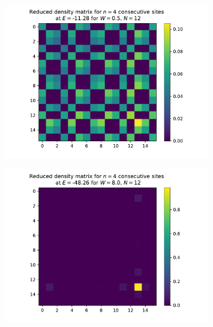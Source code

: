 \documentclass[reprint,amsmath,amssymb,aps,prb]{revtex4-2}
\begin{document}
\begin{center}
\begin{figure}[H]
\begin{subfigure}[c]{0.45\textwidth}
		\end{subfigure}
		\begin{subfigure}[c]{0.45\textwidth}
			\includegraphics[width=\textwidth]{../results/groundstates/N12n4_trainingset_groundstate_Wmax0.5.pdf}
		\end{subfigure}
		\begin{subfigure}[c]{0.45\textwidth}
			\includegraphics[width=\textwidth]{../results/groundstates/N12n4_trainingset_groundstate_Wmax8.0.pdf}
		\end{subfigure}
		\begin{subfigure}[c]{0.45\textwidth}

\end{subfigure}
\end{figure}
\end{center}
\end{document}
